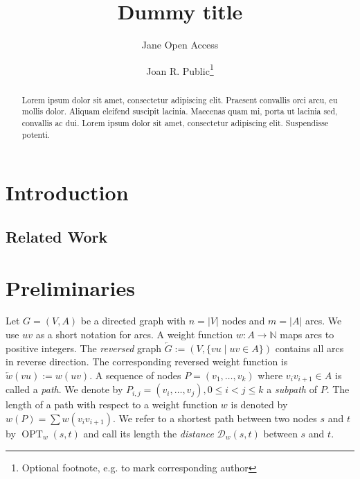 \documentclass[a4paper,UKenglish,cleveref, autoref, thm-restate]{lipics-v2021}
\title{Dummy title} %
\author{Jane {Open Access}}{Dummy University Computing Laboratory, [optional: Address], Country \and My second affiliation, Country \and \url{http://www.myhomepage.edu} }{johnqpublic@dummyuni.org}{https://orcid.org/0000-0002-1825-0097}{(Optional) author-specific funding acknowledgements}%
\author{Joan R. Public\footnote{Optional footnote, e.g. to mark corresponding author}}{Department of Informatics, Dummy College, [optional: Address], Country}{joanrpublic@dummycollege.org}{[orcid]}{[funding]}
\newcommand*{\dist}{\mathcal{D}}
\newcommand*{\shp}{\operatorname{OPT}}
\begin{document}
\maketitle

\begin{abstract}
Lorem ipsum dolor sit amet, consectetur adipiscing elit. Praesent convallis orci arcu, eu mollis dolor. Aliquam eleifend suscipit lacinia. Maecenas quam mi, porta ut lacinia sed, convallis ac dui. Lorem ipsum dolor sit amet, consectetur adipiscing elit. Suspendisse potenti. 
\end{abstract}

\newpage

\section{Introduction}
\subsection{Related Work}
\cite{bdgmpsww-rptn-16}

\section{Preliminaries}
\label{sec:prelim}

Let $G=(V,A)$ be a directed graph with $n = |V|$ nodes and $m = |A|$ arcs.
We use $uv$ as a short notation for arcs.
A weight function $w : A \to \mathbb{N}$ maps arcs to positive integers.
The \emph{reversed} graph $\overleftarrow{G} := (V, \{ vu \mid uv \in A \})$ contains all arcs in reverse direction.
The corresponding reversed weight function is $\overleftarrow{w}(vu) := w(uv)$.
A sequence of nodes $P = (v_1, \dots, v_k)$ where $v_i v_{i+1} \in A$ is called a \emph{path}.
We denote by $P_{i,j} = (v_i, \dots, v_j), 0 \leq i < j \leq k$ a \emph{subpath} of $P$.
The length of a path with respect to a weight function $w$ is denoted by $w(P) = \sum w(v_i v_{i+1})$.
We refer to a shortest path between two nodes $s$ and $t$ by $\shp_w(s,t)$ and call its length the \emph{distance} $\dist_w(s,t)$ between $s$ and $t$.
\end{document}
